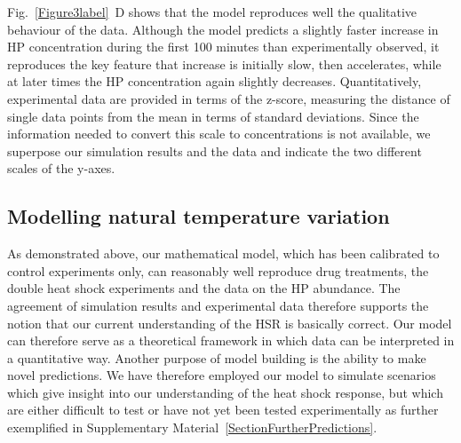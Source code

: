 \documentclass[oneside, 10pt, a4paper, twocolumn]{article}
\begin{document}
Fig.~\ref{Figure3label}~D shows that the model reproduces well the qualitative behaviour of the data.
Although the model predicts a slightly faster increase in HP concentration during the first
100 minutes than experimentally observed, it reproduces the key feature that increase is initially slow,
then accelerates, while at later times the HP concentration again slightly decreases. 
Quantitatively, experimental data are provided in terms of the z-score, 
measuring the distance of single data points from the mean in terms of standard deviations. 
Since the information needed to convert this scale to concentrations is not available, 
we superpose our simulation results and the data and  indicate the two different  scales of the y-axes. %





\subsection{Modelling natural temperature variation}
\label{SecHotDay}
\label{MaximalHPtau}

As demonstrated above, our mathematical model, which has been calibrated to control experiments only, 
can reasonably well reproduce drug treatments, the double heat shock experiments and the data on the HP abundance.
The agreement of simulation results and experimental data therefore supports the notion that our current understanding of the HSR is basically correct. Our model can therefore serve as a theoretical framework in which
data can be interpreted in a quantitative way.
Another purpose of model building is the ability to make novel predictions.
We have therefore employed our model to simulate scenarios which give insight into our understanding
of the heat shock response, but which are either difficult to test or have not yet been tested experimentally as further exemplified in Supplementary Material~\ref{SectionFurtherPredictions}.
\end{document}
